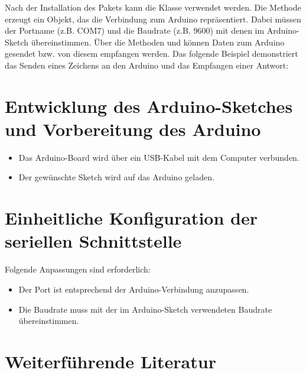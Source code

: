 Nach der Installation des Pakets  kann die Klasse  verwendet werden. Die Methode  erzeugt ein Objekt, das die Verbindung zum Arduino repräsentiert. Dabei müssen der Portname (z.B. COM7) und die Baudrate (z.B. 9600) mit denen im Arduino-Sketch übereinstimmen. Über die Methoden  und  können Daten zum Arduino gesendet bzw. von diesem empfangen werden. Das folgende Beispiel demonstriert das Senden eines Zeichens an den Arduino und das Empfangen einer Antwort:

{
	\label{Nano:TestSerialPC}
}

\section{Entwicklung des Arduino-Sketches und Vorbereitung des Arduino}

{
	\label{Nano:TestSerial}
}

\bigskip

\begin{itemize}
	\item Das Arduino-Board wird über ein USB-Kabel mit dem Computer verbunden.
	\item Der gewünschte Sketch wird auf das Arduino geladen.
\end{itemize}

\section{Einheitliche Konfiguration der seriellen Schnittstelle}

Folgende Anpassungen sind erforderlich:

\begin{itemize}
	\item Der Port  ist entsprechend der Arduino-Verbindung anzupassen.
	\item Die Baudrate  muss mit der im Arduino-Sketch verwendeten Baudrate übereinstimmen.
\end{itemize}

\section{Weiterführende Literatur}

